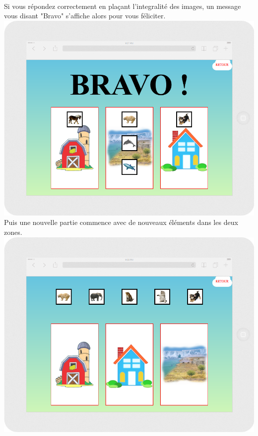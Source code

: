 \documentclass{article}
\begin{document}
\vspace{0.5cm}\\
Si vous répondez correctement en pla\c{c}ant l'integralité des images, un message vous disant "Bravo" s'affiche alors pour vous féliciter.
\vspace{0.5cm}\\
\includegraphics[width=1.0\textwidth]{zone6}
\vspace{0.5cm}\\
Puis une nouvelle partie commence avec de nouveaux éléments dans les deux zones.
\vspace{0.5cm}\\
\includegraphics[width=1.0\textwidth]{zone7}
\vspace{0.5cm}\\
\end{document}
